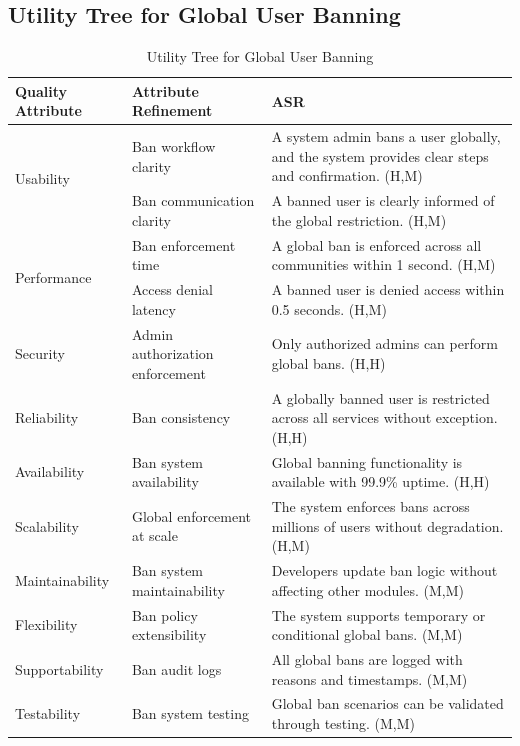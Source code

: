 \documentclass{article}
\begin{document}
\subsection{Utility Tree for Global User Banning}

\begin{table}[H]
\centering
\caption{Utility Tree for Global User Banning}
\begin{tabular}{|p{3cm}|p{4cm}|p{7cm}|}
\hline
\textbf{Quality Attribute} & \textbf{Attribute Refinement} & \textbf{ASR} \\
\hline

\multirow{2}{*}{Usability}
& Ban workflow clarity
& A system admin bans a user globally, and the system provides clear steps and confirmation. (H,M) \\
\cline{2-3}
& Ban communication clarity
& A banned user is clearly informed of the global restriction. (H,M) \\
\hline

\multirow{2}{*}{Performance}
& Ban enforcement time
& A global ban is enforced across all communities within 1 second. (H,M) \\
\cline{2-3}
& Access denial latency
& A banned user is denied access within 0.5 seconds. (H,M) \\
\hline

Security
& Admin authorization enforcement
& Only authorized admins can perform global bans. (H,H) \\
\hline

Reliability
& Ban consistency
& A globally banned user is restricted across all services without exception. (H,H) \\
\hline

Availability
& Ban system availability
& Global banning functionality is available with 99.9\% uptime. (H,H) \\
\hline

Scalability
& Global enforcement at scale
& The system enforces bans across millions of users without degradation. (H,M) \\
\hline

Maintainability
& Ban system maintainability
& Developers update ban logic without affecting other modules. (M,M) \\
\hline

Flexibility
& Ban policy extensibility
& The system supports temporary or conditional global bans. (M,M) \\
\hline

Supportability
& Ban audit logs
& All global bans are logged with reasons and timestamps. (M,M) \\
\hline

Testability
& Ban system testing
& Global ban scenarios can be validated through testing. (M,M) \\
\hline

\end{tabular}
\end{table}
\end{document}
